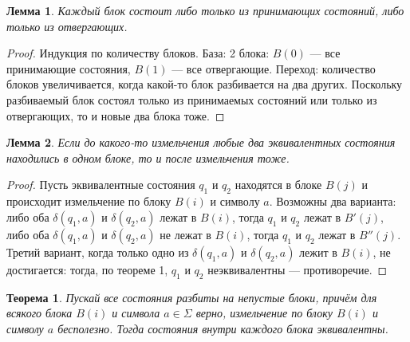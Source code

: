 \documentclass{article}
\newtheorem{theorem}{Теорема}
\newtheorem{lemma}{Лемма}
\begin{document}
\begin{lemma} Каждый блок состоит либо только из принимающих состояний, либо только из отвергающих.
\end{lemma}
\begin{proof}
Индукция по количеству блоков. База: 2 блока: $B(0)$ --- все принимающие состояния, $B(1)$ --- все отвергающие. Переход: количество блоков увеличивается, когда какой-то блок разбивается на два других. Поскольку разбиваемый блок состоял только из принимаемых состояний или только из отвергающих, то и новые два блока тоже.
\end{proof}
\begin{lemma} Если до какого-то измельчения любые два эквивалентных состояния находились в одном блоке, то и после измельчения тоже.
\end{lemma}
\begin{proof}
Пусть эквивалентные состояния $q_1$ и $q_2$ находятся в блоке $B(j)$ и происходит измельчение по блоку $B(i)$ и символу $a$. Возможны два варианта: либо оба $\delta(q_1, a)$ и $\delta(q_2, a)$ лежат в $B(i)$, тогда $q_1$ и $q_2$ лежат в $B'(j)$, либо оба $\delta(q_1, a)$ и $\delta(q_2, a)$ не лежат в $B(i)$, тогда $q_1$ и $q_2$ лежат в $B''(j)$. Третий вариант, когда только одно из $\delta(q_1, a)$ и $\delta(q_2, a)$ лежит в $B(i)$, не достигается: тогда, по теореме 1, $q_1$ и $q_2$ неэквивалентны --- противоречие.
\end{proof}
\begin{theorem}
Пускай все состояния разбиты на непустые блоки, причём для всякого блока $B(i)$ и символа $a \in \Sigma$ верно, измельчение по блоку $B(i)$ и символу $a$ бесполезно. Тогда состояния внутри каждого блока эквивалентны. 
\end{theorem}
\end{document}
